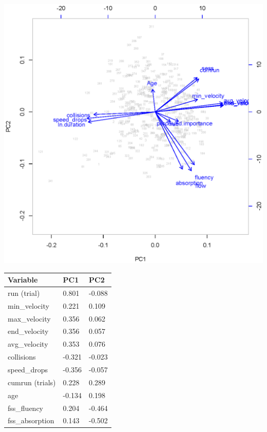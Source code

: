 \documentclass[fleqn,10pt]{wlscirep}
\begin{document}
\noindent
\begin{minipage}{\textwidth}
\begin{minipage}{.6\textwidth}
\centering
\includegraphics[width=\linewidth]{suppl_pca}
\label{fig:supp_boxes}
\end{minipage}%
\begin{minipage}{.4\textwidth}
\begin{tabular}{lll}
{\bf Variable}   &{\bf PC1}&{\bf PC2}\\
\hline
run (trial)      & 0.801  & -0.088 \\
min\_velocity    & 0.221  & 0.109  \\
max\_velocity    & 0.356  & 0.062  \\
end\_velocity    & 0.356  & 0.057  \\
avg\_velocity    & 0.353  & 0.076  \\
collisions       & -0.321 & -0.023 \\
speed\_drops     & -0.356 & -0.057 \\
cumrun (trials)  & 0.228  & 0.289  \\
age              & -0.134 & 0.198  \\
fss\_fluency     & 0.204  & -0.464 \\
fss\_absorption  & 0.143  & -0.502 \\

\end{tabular}
\end{minipage}
\end{minipage}
\end{document}
